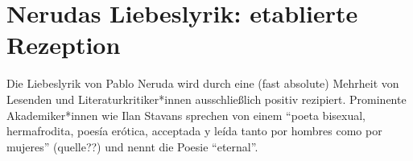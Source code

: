 \section{Nerudas Liebeslyrik: etablierte Rezeption}


Die Liebeslyrik von Pablo Neruda wird durch eine (fast absolute) Mehrheit von Lesenden und Literaturkritiker*innen ausschließlich positiv rezipiert.
Prominente Akademiker*innen wie Ilan Stavans sprechen von einem ``poeta bisexual, hermafrodita, poesía erótica, acceptada y leída tanto por hombres como por mujeres'' (quelle??)
und nennt die Poesie ``eternal''\cite{Stavans2014}.

\begin{comment}


Stavans zitieren und polemisch einsteigen: "poeta bisexual, hermafrodita, poesía erótica, accpetada y leída tanto por hombres como por mujeres"
hat er das im Seminar bei uns gesagt?
http://america.aljazeera.com/articles/2014/6/20/the-unknown-neruda.html
"Likewise, the inspiration of some of the “Twenty Love Poems and a Song of Despair” (1924), including poems XV (“Me gustas cuando callas porque estás como ausente”) and XX (“Puedo escribir los versos más tristes esta noche”), seem — there is no better way to put it! — eternal."
Kann man machen
etablierte Rezepzionsperspektive
ist weit nicht der Einzige

viele reden von "shared, symmetrical experience", wenn es in Wirklichkeit alles andere ist als das
``Antonio González Montes, for example, observes that in Neruda's work, "el amor es una experiencia fundamental, profunda y total, compromete y envuelve de modo absoluto y absorbente a los seres que lo comparten" (25).
He further notes that "el poeta se dirige en tono dialógico y apasionado a ella para enaltecer las diversas facetas y virtudes de su condición femenina excepcional y construye así una imagen casi sublime y notablemente idealizada de la mujer que comparte su amor"(25).''
// teilt sie das wirklich? In der Realität ist ihre Perspektive völlig unsichtbar und außer Acht gelassen
// interessant wo das "dialogische" herkommt, wenn sie nie was sagt

``Others who have treated Neruda's love poetry from the male perspective include: Aguirre, Alazraki, Alonso, Durán, Pérez, and Pimentel. While I do not disparage the work of these or other critics of Neruda's poetry, I feel that they have contributed to the notion that the texts are "natural" reflections of male/female relationships and that the position of the woman in the texts is an enviable one. To my knowledge, the only critics to date who have acknowledged that the asence of a feminine perspective in Neruda's poetry is problematic are John Felstiner and Marjorie Agosin.''


\end{comment}
